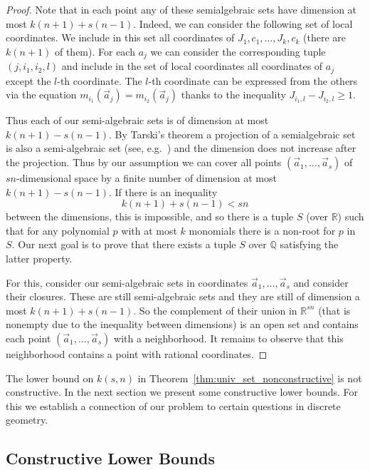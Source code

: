 \documentclass[11pt]{article}
\newcommand{\bb}[1]{\mathbb{#1}}
\begin{document}
\begin{proof}
Note that in each point any of these semialgebraic sets have dimension at most $k(n+1) + s(n-1)$. Indeed, we can consider the following set of local coordinates. We include in this set all coordinates of $J_{1},c_{1},\ldots, J_k, c_k$ (there are $k(n+1)$ of them). For each $a_{j}$ we can consider the corresponding tuple $(j,i_1,i_2,l)$ and include in the set of local coordinates all coordinates of $a_j$ except the $l$-th coordinate. The $l$-th coordinate can be expressed from the others via the equation $m_{i_1}(\vec{a}_j)= m_{i_2}(\vec{a}_j)$ thanks to the inequality $J_{i_1,l} - J_{i_2,l} \geq 1$.

Thus each of our semi-algebraic sets is of dimension at most $k(n+1)-s(n-1)$. By Tarski's theorem a projection of a semialgebraic set is also a semi-algebraic set (see, e.g.~\cite{BasuPR06}) and the dimension does not increase after the projection. Thus by our assumption we can cover all points $(\vec{a}_1,\ldots, \vec{a}_s)$ of $sn$-dimensional space by a finite number of dimension at most $k(n+1)-s(n-1)$. If there is an inequality
$$
k(n+1) + s(n-1) < sn
$$
between the dimensions, this is impossible,  and so there is a tuple $S$ (over $\bb{R}$) such that for any polynomial $p$ with at most $k$ monomials there is a non-root for $p$ in $S$. Our next goal is to prove that there
exists a tuple $S$ over $\bb{Q}$ satisfying the latter property.

For this, consider our semi-algebraic sets in coordinates $\vec{a}_1,\ldots, \vec{a}_s$ and consider their closures. These are still semi-algebraic sets and they are still of dimension a most $k(n+1) + s(n-1)$. So the complement of their union in $\bb{R}^{sn}$ (that is nonempty due to the inequality between dimensions) is an open set and contains each point $(\vec{a}_1,\ldots, \vec{a}_s)$ with a neighborhood. It remains to observe that this neighborhood contains a point with rational coordinates.
\end{proof}



The lower bound on $k(s,n)$ in Theorem~\ref{thm:univ_set_nonconstructive} is not constructive.
In the next section we present some constructive lower bounds. 
For this we establish a connection of our problem to certain questions in discrete geometry.

\subsection{Constructive Lower Bounds} 
\end{document}
